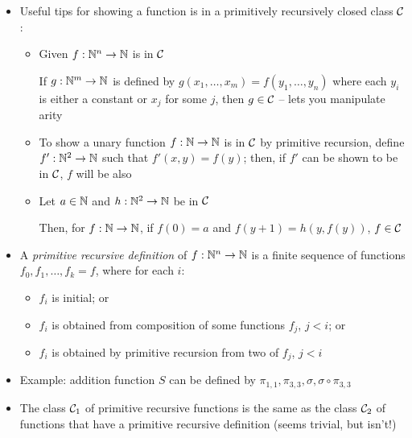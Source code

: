 \begin{itemize}
	\newpage
	
	\item Useful tips for showing a function is in a primitively recursively closed class $ \mathcal{C} $:
	
	
	\begin{itemize}
		
		\item Given $ f: \mathbb{N}^n \to \mathbb{N} $ is in $ \mathcal{C} $
		
		If $ g: \mathbb{N}^m \to \mathbb{N} $ is defined by $ g(x_1, \dots, x_m) = f(y_1, \dots, y_n) $ where each $ y_i $ is either a constant or $ x_j $ for some $ j $, then $ g \in \mathcal{C} $ -- lets you manipulate arity
		
		\item To show a unary function $ f: \mathbb{N} \to \mathbb{N} $ is in $ \mathcal{C} $ by primitive recursion, define $ f': \mathbb{N}^2 \to \mathbb{N} $ such that $ f'(x, y) = f(y) $; then, if $ f' $ can be shown to be in $ \mathcal{C} $, $ f $ will be also
		
		\item Let $ a \in \mathbb{N} $ and $ h: \mathbb{N}^2 \to \mathbb{N} $ be in $ \mathcal{C} $
		
		Then, for $ f: \mathbb{N} \to \mathbb{N} $, if $ f(0) = a $ and $ f(y + 1) = h(y, f(y)) $, $ f \in \mathcal{C} $
		
	\end{itemize}

	\item A \textit{primitive recursive definition} of $ f: \mathbb{N}^n \to \mathbb{N} $ is a finite sequence of functions $ f_0, f_1, \dots, f_k = f $, where for each $ i $:
	
	\begin{itemize}
		
		\item $ f_i $ is initial; or
		
		\item $ f_i $ is obtained from composition of some functions $ f_j $, $ j < i $; or
		
		\item $ f_i $ is obtained by primitive recursion from two of $ f_j $, $ j < i $
		
	\end{itemize}

	\item Example: addition function $ S $ can be defined by $ \pi_{1, 1}, \pi_{3, 3}, \sigma, \sigma \circ \pi_{3, 3} $
	
	\item The class $ \mathcal{C}_1 $ of primitive recursive functions is the same as the class $ \mathcal{C}_2 $ of functions that have a primitive recursive definition (seems trivial, but isn't!)
	

\end{itemize}
